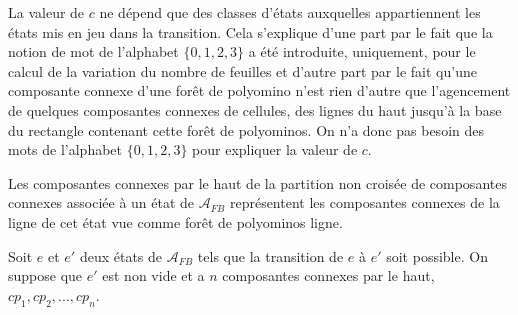  La valeur de $c$ ne dépend  que des classes d'états auxquelles appartiennent les états mis  en jeu dans la transition. Cela s'explique d'une part par le fait que la notion de mot de l'alphabet $\{0,1,2,3\}$ a été introduite, uniquement, pour le calcul de la variation du nombre de  feuilles et d'autre part par le fait qu'une composante connexe d'une forêt de polyomino n'est rien d'autre que l'agencement de quelques composantes connexes de cellules, des lignes du haut jusqu'à la base du rectangle contenant cette forêt de polyominos. On n'a donc pas besoin des mots de  l'alphabet $\{0,1,2,3\}$ pour expliquer la valeur de $c$.
 
  Les composantes connexes par le haut  de la partition non croisée de composantes connexes  associée à un état de $\mathcal{A}_{FB}$ représentent les composantes connexes de la ligne de cet état vue comme forêt de polyominos ligne.


Soit $e$ et $e'$ deux états de $\mathcal{A}_{FB}$ tels que la transition  de $e$ à $e'$  soit possible.  On suppose que $e'$ est non vide et  a $n$ composantes connexes par le haut, $cp_{1}, cp_{2},...,cp_{n}$.  

